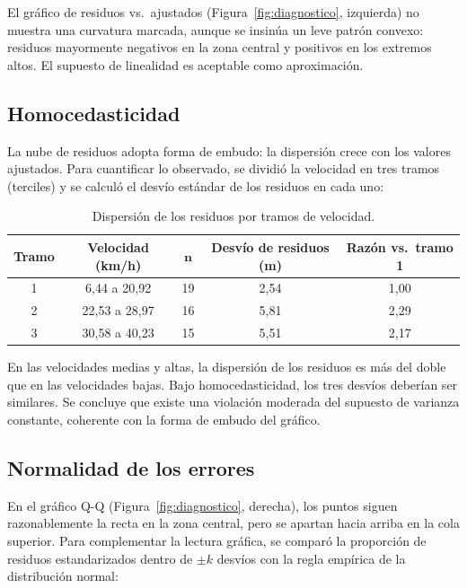 \documentclass[12pt,a4paper]{article}
\begin{document}
El gráfico de residuos vs.\ ajustados (Figura~\ref{fig:diagnostico}, izquierda) no muestra una curvatura marcada, aunque se insinúa un leve patrón convexo: residuos mayormente negativos en la zona central y positivos en los extremos altos. El supuesto de linealidad es aceptable como aproximación.

\subsection{Homocedasticidad}

La nube de residuos adopta forma de embudo: la dispersión crece con los valores ajustados. Para cuantificar lo observado, se dividió la velocidad en tres tramos (terciles) y se calculó el desvío estándar de los residuos en cada uno:

\begin{table}[H]
\centering
\caption{Dispersión de los residuos por tramos de velocidad.}
\begin{tabular}{ccccc}
\toprule
\textbf{Tramo} & \textbf{Velocidad (km/h)} & $\boldsymbol{n}$ & \textbf{Desvío de residuos (m)} & \textbf{Razón vs.\ tramo 1} \\
\midrule
1 & 6{,}44 a 20{,}92 & 19 & 2{,}54 & 1{,}00 \\
2 & 22{,}53 a 28{,}97 & 16 & 5{,}81 & 2{,}29 \\
3 & 30{,}58 a 40{,}23 & 15 & 5{,}51 & 2{,}17 \\
\bottomrule
\end{tabular}
\end{table}

En las velocidades medias y altas, la dispersión de los residuos es más del doble que en las velocidades bajas. Bajo homocedasticidad, los tres desvíos deberían ser similares. Se concluye que existe una violación moderada del supuesto de varianza constante, coherente con la forma de embudo del gráfico.

\subsection{Normalidad de los errores}

En el gráfico Q-Q (Figura~\ref{fig:diagnostico}, derecha), los puntos siguen razonablemente la recta en la zona central, pero se apartan hacia arriba en la cola superior. Para complementar la lectura gráfica, se comparó la proporción de residuos estandarizados dentro de $\pm k$ desvíos con la regla empírica de la distribución normal:
\end{document}
